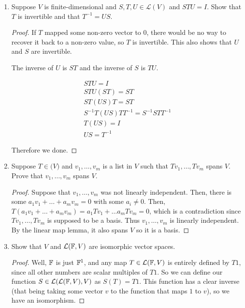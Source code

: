 \begin{enumerate}
\begin{proof}
        Therefore $T_{|U}$ is an invertible linear map, the definition of isomorphism.
        
    \end{proof}

    \item[12] Suppose $V$ is finite-dimensional and $S, T, U \in \mathcal L(V)$ and $STU = I$. Show that $T$ is invertible and that $T^{-1} = US$.
    
    \begin{proof}
        If $T$ mapped some non-zero vector to 0, there would be no way to recover it back to a non-zero value, so $T$ is invertible. This also shows that $U$ and $S$ are invertible.
        
        The inverse of $U$ is $ST$ and the inverse of $S$ is $TU$. 

        \begin{align*}
            STU = I \\
            STU(ST) = ST \\
            ST(US)T = ST \\
            S^{-1}T(US)TT^{-1} = S^{-1}STT^{-1} \\
            T(US) = I \\
            US = T^{-1}
        \end{align*}

        Therefore we done.
    \end{proof}


    \item[15] Suppose $T \in \mathcal(V)$ and $v_1, \dots, v_m$ is a list in $V$ such that $Tv_1, \dots, Tv_m$ spans $V$. Prove that $v_1, \dots, v_m$ spans $V$. 
    
    \begin{proof}
        Suppose that $v_1, \dots, v_m$ was not linearly independent. Then, there is some $a_1v_1+ \dots+ a_mv_m = 0$ with some $a_i \neq 0$. Then, $T(a_1v_1 + \dots + a_mv_m) = a_1Tv_1 + \dots a_mTv_m = 0$, which is a contradiction since $Tv_1, \dots, Tv_m$ is supposed to be a basis. Thus $v_1, \dots, v_m$ is linearly independent. By the linear map lemma, it also spans $V$ so it is a basis.
    \end{proof}


    \item[18] Show that $V$ and $\mathcal L(\mathbb{F}, V)$ are isomorphic vector spaces.
    
    \begin{proof}
        Well, $\mathbb{F}$ is just $\mathbb{F}^1$, and any map $T \in \mathcal L(\mathbb{F}, V)$ is entirely defined by $T1$, since all other numbers are scalar multiples of $T1$. So we can define our function $S \in \mathcal L(\mathcal L(\mathbb{F}, V), V)$ as $S(T) = T1$. This function has a clear inverse (that being taking some vector $v$ to the function that maps $1$ to $v$), so we have an isomorphism.
    \end{proof}


\end{enumerate}
